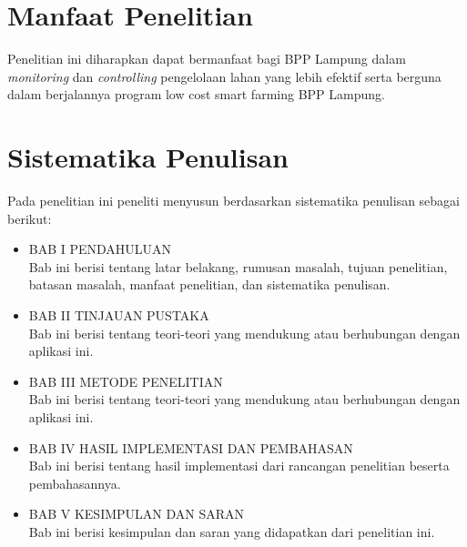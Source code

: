 \begin{flushleft}
\begin{justify}
    \section{Manfaat Penelitian}
    Penelitian ini diharapkan dapat bermanfaat bagi BPP Lampung dalam \textit{monitoring} dan \textit{controlling} pengelolaan lahan yang lebih efektif serta berguna dalam berjalannya program low cost smart farming BPP Lampung.
    \\


    \section{Sistematika Penulisan}
    Pada penelitian ini peneliti menyusun berdasarkan sistematika penulisan sebagai berikut: 
      \begin{itemize}
        \item BAB I PENDAHULUAN
        \\
        Bab ini berisi tentang latar belakang, rumusan masalah, tujuan penelitian, 
        batasan masalah, manfaat penelitian, dan sistematika penulisan.

        \item BAB II TINJAUAN PUSTAKA
        \\
          Bab ini berisi tentang teori-teori yang mendukung atau berhubungan dengan aplikasi ini.
        \item BAB III METODE PENELITIAN
        \\
          Bab ini berisi tentang teori-teori yang mendukung atau berhubungan dengan aplikasi ini.
        \item BAB IV HASIL IMPLEMENTASI DAN PEMBAHASAN
        \\
          Bab ini berisi tentang hasil implementasi dari rancangan penelitian beserta pembahasannya.
        \item BAB V KESIMPULAN DAN SARAN
        \\
          Bab ini berisi kesimpulan dan saran yang didapatkan dari penelitian ini.
        \\
      \end{itemize}

  \end{justify}

\end{flushleft}
\newpage